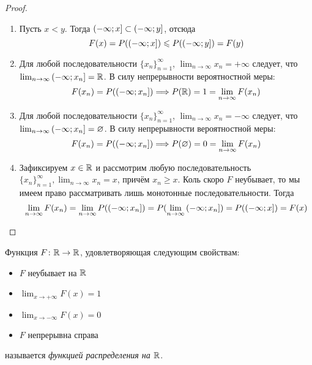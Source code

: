 \begin{proof}~
	\begin{enumerate}
		\item Пусть $x < y$. Тогда $\left(-\infty; x\right] \subset \left(-\infty; y\right]$, отсюда
		\[
			F(x) = P(\left(-\infty; x\right]) \leqslant P(\left(-\infty; y\right]) = F(y)
		\]
		
		\item Для любой последовательности $\{x_n\}_{n = 1}^\infty$, $\lim_{n \to \infty} x_n = +\infty$ следует, что \\ $\lim_{n \to \infty} \left(-\infty; x_n\right] = \mathbb{R}$. В силу непрерывности вероятностной меры:
		\[
			F(x_n) = P(\left(-\infty; x_n\right]) \Longrightarrow P(\mathbb{R}) = 1 = \lim_{n \to \infty} F(x_n)
		\]
		
		\item Для любой последовательности $\{x_n\}_{n = 1}^\infty$, $\lim_{n \to \infty} x_n = -\infty$ следует, что \\ $\lim_{n \to \infty} \left(-\infty; x_n\right] = \varnothing$. В силу непрерывности вероятностной меры:
		\[
			F(x_n) = P(\left(-\infty; x_n\right]) \Longrightarrow P(\varnothing) = 0 = \lim_{n \to \infty} F(x_n)
		\]
		
		\item Зафиксируем $x \in \mathbb{R}$ и рассмотрим любую последовательность $\{x_n\}_{n = 1}^\infty, \lim_{n \to \infty} x_n = x$, причём $x_n \ge x$. Коль скоро $F$ неубывает, то мы имеем право рассматривать лишь монотонные последовательности. Тогда
		\[
			\lim_{n \to \infty} F(x_n) = \lim_{n \to \infty} P(\left(-\infty; x_n\right]) = P(\lim_{n \to \infty} \left(-\infty; x_n\right]) = P(\left(-\infty; x\right]) = F(x)
		\]
	\end{enumerate}
\end{proof}

\begin{definition}
	Функция $F \colon \mathbb{R} \to \mathbb{R}$, удовлетворяющая следующим свойствам:
	\begin{itemize}
		\item $F$ неубывает на $\mathbb{R}$
		
		\item $\lim_{x \to +\infty} F(x) = 1$
		
		\item $\lim_{x \to -\infty} F(x) = 0$
		
		\item $F$ непрерывна справа
	\end{itemize}
	называется \textit{функцией распределения на $\mathbb{R}$}.
\end{definition}

